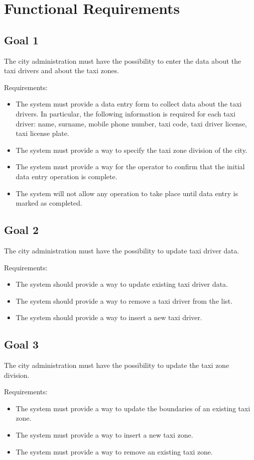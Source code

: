 \section{Functional Requirements}
\subsection{Goal 1}
The city administration must have the possibility to enter the data about the taxi drivers and about the taxi zones. 

Requirements:
\begin{itemize}
\item The system must provide a data entry form to collect data about the taxi drivers. In particular, the following information is required for each taxi driver: name, surname, mobile phone number, taxi code, taxi driver license, taxi license plate.
\item The system must provide a way to specify the taxi zone division of the city. 
\item The system must provide a way for the operator to confirm that the initial data entry operation is complete. 
\item The system will not allow any operation to take place until data entry is marked as completed. 
\end{itemize}


\subsection{Goal 2}
The city administration must have the possibility to update taxi driver data.

Requirements:
\begin{itemize}
\item The system should provide a way to update existing taxi driver data. 
\item The system should provide a way to remove a taxi driver from the list.
\item The system should provide a way to insert a new taxi driver.
\end{itemize}


\subsection{Goal 3}
The city administration must have the possibility to update the taxi zone division.

Requirements:
\begin{itemize}
\item The system must provide a way to update the boundaries of an existing taxi zone. 
\item The system must provide a way to insert a new taxi zone.
\item The system must provide a way to remove an existing taxi zone.
\end{itemize}


